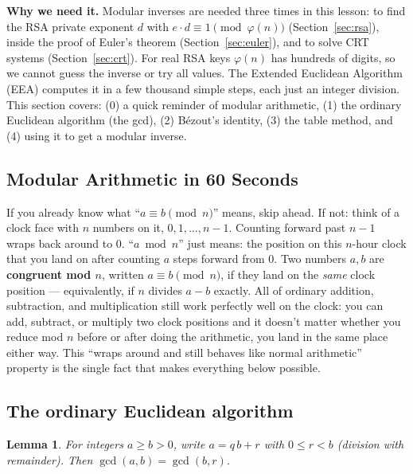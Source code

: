 \documentclass[11pt]{article}
\newtheorem{lemma}[theorem]{Lemma}
\theoremstyle{definition}
\theoremstyle{remark}
\begin{document}
\textbf{Why we need it.} Modular inverses are needed three times in this lesson: to find the RSA private exponent $d$ with $e\cdot d\equiv 1 \pmod{\varphi(n)}$ (Section~\ref{sec:rsa}), inside the proof of Euler's theorem (Section~\ref{sec:euler}), and to solve CRT systems (Section~\ref{sec:crt}). For real RSA keys $\varphi(n)$ has hundreds of digits, so we cannot guess the inverse or try all values. The Extended Euclidean Algorithm (EEA) computes it in a few thousand simple steps, each just an integer division. This section covers: (0) a quick reminder of modular arithmetic, (1) the ordinary Euclidean algorithm (the gcd), (2) B\'ezout's identity, (3) the table method, and (4) using it to get a modular inverse.

\subsection{Modular Arithmetic in 60 Seconds}\label{sec:modarith}


If you already know what ``$a \equiv b \pmod n$'' means, skip ahead. If not: think of a clock face with $n$ numbers on it, $0,1,\dots,n-1$. Counting forward past $n-1$ wraps back around to $0$. ``$a \bmod n$'' just means: the position on this $n$-hour clock that you land on after counting $a$ steps forward from $0$. Two numbers $a,b$ are \textbf{congruent mod $n$}, written $a\equiv b\pmod n$, if they land on the \emph{same} clock position — equivalently, if $n$ divides $a-b$ exactly. All of ordinary addition, subtraction, and multiplication still work perfectly well on the clock: you can add, subtract, or multiply two clock positions and it doesn't matter whether you reduce mod $n$ before or after doing the arithmetic, you land in the same place either way. This ``wraps around and still behaves like normal arithmetic'' property is the single fact that makes everything below possible.


\subsection{The ordinary Euclidean algorithm}\label{sec:euclid}

\begin{lemma}\label{lem:euclid}
For integers $a\ge b>0$, write $a=q\,b+r$ with $0\le r<b$ (division with remainder). Then $\gcd(a,b)=\gcd(b,r)$.
\end{lemma}
\end{document}
